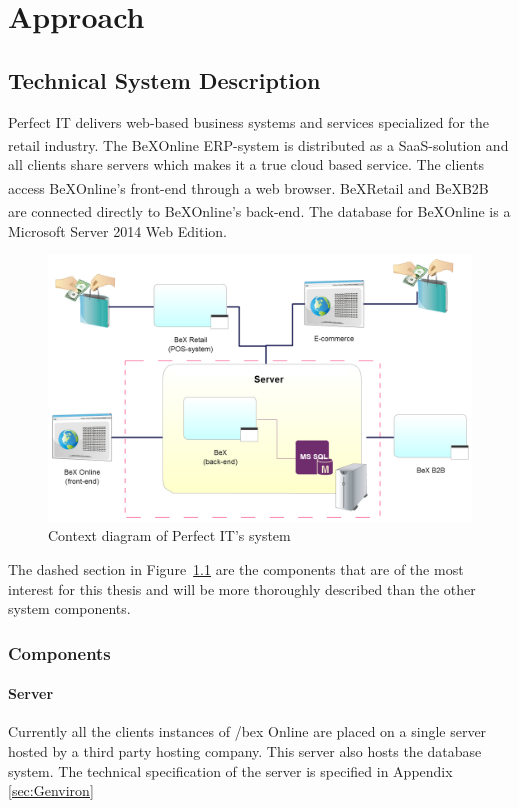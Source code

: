 \documentclass{cslthse-msc}
\newcommand{\bex}{BeX\textsuperscript{\textregistered}}
\begin{document}
\chapter{Approach}\label{sec:approach}

\section{Technical System Description}
Perfect IT delivers web-based business systems and services specialized for the retail industry. The \bex Online ERP-system is distributed as a SaaS-solution and all clients share servers which makes it a true cloud based service. The clients access \bex Online's front-end through a web browser. \bex Retail and \bex B2B are connected directly to \bex Online's back-end.
The database for \bex Online is a Microsoft Server 2014 Web Edition.
\begin{figure}[H]
\vspace{-15pt}
  \begin{center}
    \includegraphics[scale=0.3]{Pictures/Systemdesc.png}
  \end{center}
  \caption{Context diagram of Perfect IT's system}
  \label{context}
  \vspace{-15pt}
\end{figure}
\noindent The dashed section in Figure~\ref{context} are the components that are of the most interest for this thesis and will be more thoroughly described than the other system components.

\subsection{Components}


\subsubsection{Server}
Currently all the clients instances of /bex Online are placed on a single server hosted by a third party hosting company. This server also hosts the database system.
The technical specification of the server is specified in Appendix \ref{sec:Genviron}
\end{document}
